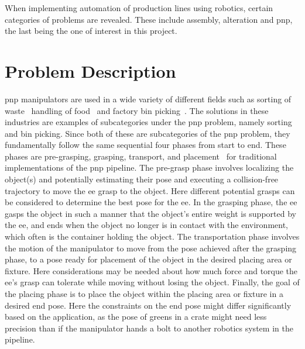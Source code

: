 When implementing automation of production lines using robotics, certain categories of problems are revealed. These include assembly, alteration and \gls{pnp}, the last being the one of interest in this project. 

\section{Problem Description}\label{sec:intro-problem-description}
\gls{pnp} \gls{manipulator}s are used in a wide variety of different fields such as 
sorting of waste~\cite{robotic-pick-and-toss-facilitates-urban-waste-sorting}
handling of food~\cite{automation-of-mobile-pick-and-place-robotic-system-for-small-food-industry, development-of-a-food-handling-soft-robot-hand-considering-a-high-speed-pick-and-place-task} and factory bin picking~\cite{real-time-industrial-bin-picking-with-a-hybrid-deep-learning-engineering-approach, a-bin-picking-benchmark-for-systematic-evaluation-of-robotic-pick-and-place-systems, generic-development-of-bin-pick-and-place-system-based-on-robot-operating-system}. The solutions in these industries are examples of subcategories under the \gls{pnp} problem, namely sorting and bin picking. Since both of these are subcategories of the \gls{pnp} problem, they fundamentally follow the same sequential four phases from start to end. 
These phases are pre-grasping, grasping, transport, and placement~\cite{a-bin-picking-benchmark-for-systematic-evaluation-of-robotic-pick-and-place-systems} for traditional implementations of the \gls{pnp} pipeline.
The pre-grasp phase involves localizing the object(s) and potentially estimating their pose and executing a collision-free trajectory to move the \gls{ee} grasp to the object. Here different potential grasps can be considered to determine the best pose for the \gls{ee}.
In the grasping phase, the \gls{ee} gasps the object in such a manner that the object's entire weight is supported by the \gls{ee}, and ends when the object no longer is in contact with the environment, which often is the container holding the object.
The transportation phase involves the motion of the \gls{manipulator} to move from the pose achieved after the grasping phase, to a pose ready for placement of the object in the desired placing area or fixture. Here considerations may be needed about how much force and torque the \gls{ee}'s grasp can tolerate while moving without losing the object.
Finally, the goal of the placing phase is to place the object within the placing area or fixture in a desired end pose. Here the constraints on the end pose might differ significantly based on the application, as the pose of greens in a crate might need less precision than if the manipulator hands a bolt to another robotics system in the pipeline. \medskip

